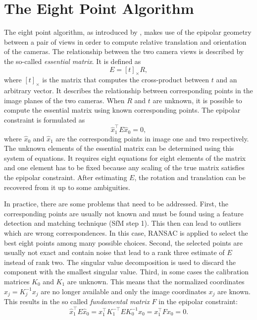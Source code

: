 	\section{The Eight Point Algorithm}
		The eight point algorithm, as introduced by \cite{longuet1981}, makes use of the epipolar geometry between a pair of views in order to compute relative translation and orientation of the cameras.
		The relationship between the two camera views is described by the so-called \emph{essential matrix}.
		It is defined as 
		\begin{equation}\label{eq:essential_matrix}
			E = \left[ t \right]_\times \! R,
		\end{equation}
		where $\left[ t \right]_\times$ is the matrix that computes the cross-product between $t$ and an arbitrary vector.
		It describes the relationship between corresponding points in the image planes of the two cameras.
		When $R$ and $t$ are unknown, it is possible to compute the essential matrix using known corresponding points.
		The epipolar constraint is formulated as 
		\begin{equation}\label{eq:epipolar_constraint}
			\hat{x}_1^\top E \hat{x}_0 = 0,
		\end{equation}
		where $\hat{x}_0$ and $\hat{x}_1$ are the corresponding points in image one and two respectively.
		The unknown elements of the essential matrix can be determined using this system of equations.
		It requires eight equations for eight elements of the matrix and one element has to be fixed because any scaling of the true matrix satisfies the epipolar constraint.
		After estimating $E$, the rotation and translation can be recovered from it up to some ambiguities.
		
		In practice, there are some problems that need to be addressed.
		First, the corresponding points are usually not known and must be found using a feature detection and matching technique (SfM step 1).
		This then can lead to outliers which are wrong correspondences.
		In this case, {RANSAC} is applied to select the best eight points among many possible choices.
		Second, the selected points are usually not exact and contain noise that lead to a rank three estimate of $E$ instead of rank two.
		The singular value decomposition is used to discard the component with the smallest singular value.
		Third, in some cases the calibration matrices $K_0$ and $K_1$ are unknown.
		This means that the normalized coordinates $\hat{x}_j = K_j^{-1} x_j$ are no longer available and only the image coordinates $x_j$ are known.
		This results in the so called \emph{fundamental matrix} $F$ in the epipolar constraint:
		\begin{equation}
			\hat{x}_1^\top E \hat{x}_0 = x_1^\top K_1^{-\top} E K_0^{-1} x_0 = x_1^\top F x_0 = 0.
		\end{equation}
		
